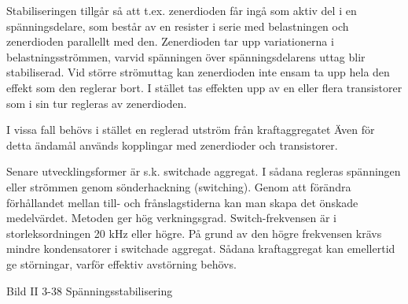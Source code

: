 Stabiliseringen tillgår så att t.ex. zenerdioden får ingå som aktiv
del i en spänningsdelare, som består av en resister i serie med
belastningen och zenerdioden parallellt med den. Zenerdioden tar upp
variationerna i belastningsströmmen, varvid spänningen över
spänningsdelarens uttag blir stabiliserad. Vid större strömuttag kan
zenerdioden inte ensam ta upp hela den effekt som den reglerar bort. I
stället tas effekten upp av en eller flera transistorer som i sin tur
regleras av zenerdioden.

I vissa fall behövs i stället en reglerad utström från kraftaggregatet
Även för detta ändamål används kopplingar med zenerdioder och
transistorer.

Senare utvecklingsformer är s.k. switchade aggregat. I sådana regleras
spänningen eller strömmen genom sönderhackning (switching). Genom att
förändra förhållandet mellan till- och frånslagstiderna kan man skapa
det önskade medelvärdet. Metoden ger hög
verkningsgrad. Switch-frekvensen är i storleksordningen 20 kHz eller
högre. På grund av den högre frekvensen krävs mindre kondensatorer i
switchade aggregat. Sådana kraftaggregat kan emellertid ge störningar,
varför effektiv avstörning behövs.

Bild II 3-38 Spänningsstabilisering
